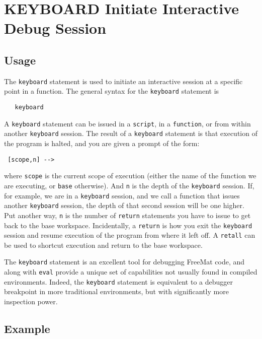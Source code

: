 \section{KEYBOARD Initiate Interactive Debug Session}

\subsection{Usage}

The \verb|keyboard| statement is used to initiate an
interactive session at a specific point in a function.
The general syntax for the \verb|keyboard| statement is
\begin{verbatim}
   keyboard
\end{verbatim}
A \verb|keyboard| statement can be issued in a \verb|script|,
in a \verb|function|, or from within another \verb|keyboard| session.
The result of a \verb|keyboard| statement is that execution
of the program is halted, and you are given a prompt
of the form:
\begin{verbatim}
 [scope,n] -->
\end{verbatim}
where \verb|scope| is the current scope of execution (either
the name of the function we are executing, or \verb|base| otherwise).
And \verb|n| is the depth of the \verb|keyboard| session. If, for example,
we are in a \verb|keyboard| session, and we call a function that issues
another \verb|keyboard| session, the depth of that second session 
will be one higher.  Put another way, \verb|n| is the number of \verb|return|
statements you have to issue to get back to the base workspace.
Incidentally, a \verb|return| is how you exit the \verb|keyboard| session
and resume execution of the program from where it left off.  A
\verb|retall| can be used to shortcut execution and return to the base
workspace.

The \verb|keyboard| statement is an excellent tool for debugging
FreeMat code, and along with \verb|eval| provide a unique set of
capabilities not usually found in compiled environments.  Indeed,
the \verb|keyboard| statement is equivalent to a debugger breakpoint in 
more traditional environments, but with significantly more inspection
power.
\subsection{Example}

